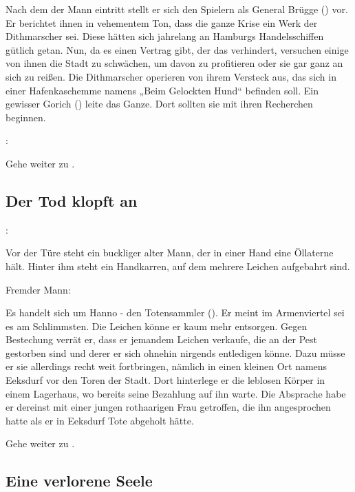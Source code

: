 Nach dem der Mann eintritt stellt er sich den Spielern als General Brügge (\blue{\ref{Brügge}}) vor. Er berichtet ihnen in vehementem Ton, dass die ganze Krise ein Werk der Dithmarscher sei. Diese hätten sich jahrelang an Hamburgs Handelsschiffen gütlich getan. Nun, da es einen Vertrag gibt, der das verhindert, versuchen einige von ihnen die Stadt zu schwächen, um davon zu profitieren oder sie gar ganz an sich zu reißen. Die Dithmarscher operieren von ihrem Versteck aus, das sich in einer Hafenkaschemme namens „Beim Gelockten Hund“ befinden soll. Ein gewisser Gorich (\blue{\ref{Gorich}}) leite das Ganze. Dort sollten sie mit ihren Recherchen beginnen.


:


Gehe weiter zu \blue{\ref{weiter}}.

\subsection{Der Tod klopft an}
\label{tot}

:

Vor der Türe steht ein buckliger alter Mann, der in einer Hand eine Öllaterne hält. Hinter ihm steht ein Handkarren, auf dem mehrere Leichen aufgebahrt sind.

Fremder Mann:

Es handelt sich um Hanno - den Totensammler (\blue{\ref{Hanno}}). Er meint im Armenviertel sei es am Schlimmsten. Die Leichen könne er kaum mehr entsorgen. Gegen Bestechung verrät er, dass er jemandem Leichen verkaufe, die an der Pest gestorben sind und derer er sich ohnehin nirgends entledigen könne. Dazu müsse er sie allerdings recht weit fortbringen, nämlich in einen kleinen Ort namens Eeksdurf vor den Toren der Stadt. Dort hinterlege er die leblosen Körper in einem Lagerhaus, wo bereits seine Bezahlung auf ihn warte. Die Absprache habe er dereinst mit einer jungen rothaarigen Frau getroffen, die ihn angesprochen hatte als er in Eeksdurf Tote abgeholt hätte.

Gehe weiter zu \blue{\ref{weiter}}.

\subsection{Eine verlorene Seele}
\label{kind}

